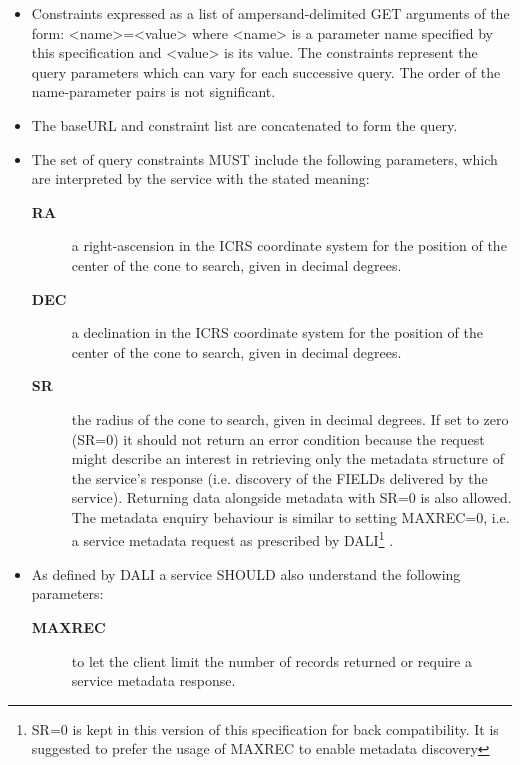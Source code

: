 \documentclass[11pt,a4paper]{ivoa}
\begin{document}
\begin{itemize}
		\item Constraints expressed as a list of
			ampersand-delimited GET arguments of the form: <name>=<value> where
			<name> is a parameter name specified by this specification and <value>
			is its value. The constraints represent the query parameters which can
			vary for each successive query. The order of the name-parameter pairs is
			not significant.
		\item The baseURL and constraint list are concatenated
			to form the query. 
		\item The set of query constraints MUST include the
			following parameters, which are interpreted by the service with the
			stated meaning: 
			\begin{description}
				\item[\textbf{RA}] a right-ascension
					in the ICRS coordinate system for the position of the center of the cone
					to search, given in decimal degrees.
				\item[\textbf{DEC}] a declination
					in the ICRS coordinate system for the position of the center of the cone
					to search, given in decimal degrees.
				\item[\textbf{SR}] the radius of the cone to search, given in decimal degrees.
					If set to zero (SR=0) it should not return an error condition because the
					request might describe an interest in retrieving only the metadata structure
					of the service's response (i.e. discovery of the FIELDs delivered by the service).
					Returning data alongside metadata with SR=0 is also allowed.
					The metadata enquiry behaviour is similar to setting MAXREC=0, i.e. a service
					metadata request as prescribed 	by DALI\footnote{SR=0 is kept in this version 
					of this specification for back compatibility. It is suggested to prefer the
					usage of MAXREC to enable metadata discovery} \citep{2017ivoa.spec.0517D}.
			\end{description}
		\item As defined by DALI a service SHOULD also understand the following parameters:
			\begin{description}
				\item[\textbf{MAXREC}] to let the client limit the number of records returned
					or require a service metadata response.

\end{description}
\end{itemize}
\end{document}
